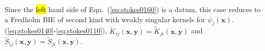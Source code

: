 \documentclass[oneside,onecolumn,10pt,final]{asme2ej}
\newcounter{tema}
\begin{document}
%
Since the \hl {left} hand side of Eqn.~(\ref{eq:stokes0160}) 
is a datum, this case reduces to a Fredholm BIE of second
kind with weakly singular kernels for $\psi_j (\bm {x})$. 
\noindent
{}~
(\ref{eq:stokes0140}-\ref{eq:stokes0110}), 
${\tilde K}_{ij} (\bm{x},\bm{y})={\tilde K}_{ji} (\bm{x},\bm{y})$ and
${\tilde S}_{ij} (\bm{x},\bm{y})={\tilde S}_{ji} (\bm{x},\bm{y})$.   
%
\end{document}
